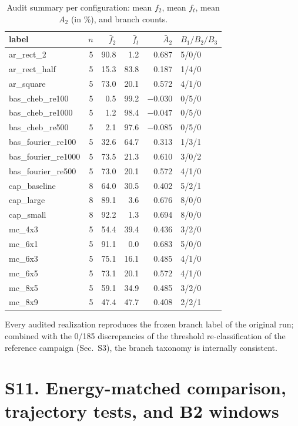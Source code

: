 \documentclass[11pt]{article}
\begin{document}
\begin{table}[h]
\centering\footnotesize
\caption{Audit summary per configuration: mean $f_2$, mean $f_t$, mean $A_2$
(in \%), and branch counts.}
\label{tab:S10b}
\begin{tabular}{lrrrrl}
\toprule
label & $n$ & $\bar f_2$ & $\bar f_t$ & $\bar A_2$ & $B_1/B_2/B_3$\\
\midrule
ar\_rect\_2 & 5 & 90.8 & 1.2 & 0.687 & 5/0/0\\
ar\_rect\_half & 5 & 15.3 & 83.8 & 0.187 & 1/4/0\\
ar\_square & 5 & 73.0 & 20.1 & 0.572 & 4/1/0\\
bas\_cheb\_re100 & 5 & 0.5 & 99.2 & $-0.030$ & 0/5/0\\
bas\_cheb\_re1000 & 5 & 1.2 & 98.4 & $-0.047$ & 0/5/0\\
bas\_cheb\_re500 & 5 & 2.1 & 97.6 & $-0.085$ & 0/5/0\\
bas\_fourier\_re100 & 5 & 32.6 & 64.7 & 0.313 & 1/3/1\\
bas\_fourier\_re1000 & 5 & 73.5 & 21.3 & 0.610 & 3/0/2\\
bas\_fourier\_re500 & 5 & 73.0 & 20.1 & 0.572 & 4/1/0\\
cap\_baseline & 8 & 64.0 & 30.5 & 0.402 & 5/2/1\\
cap\_large & 8 & 89.1 & 3.6 & 0.676 & 8/0/0\\
cap\_small & 8 & 92.2 & 1.3 & 0.694 & 8/0/0\\
mc\_4x3 & 5 & 54.4 & 39.4 & 0.436 & 3/2/0\\
mc\_6x1 & 5 & 91.1 & 0.0 & 0.683 & 5/0/0\\
mc\_6x3 & 5 & 75.1 & 16.1 & 0.485 & 4/1/0\\
mc\_6x5 & 5 & 73.1 & 20.1 & 0.572 & 4/1/0\\
mc\_8x5 & 5 & 59.1 & 34.9 & 0.485 & 3/2/0\\
mc\_8x9 & 5 & 47.4 & 47.7 & 0.408 & 2/2/1\\
\bottomrule
\end{tabular}
\end{table}

Every audited realization reproduces the frozen branch label of the original
run; combined with the 0/185 discrepancies of the threshold re-classification of
the reference campaign (Sec.~S3), the branch taxonomy is internally consistent.

\section{S11. Energy-matched comparison, trajectory tests, and B2 windows}
\label{sec:S11}
\end{document}
